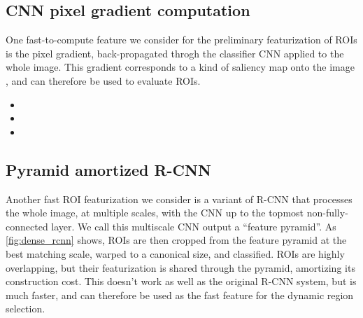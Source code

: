 \subsection{CNN pixel gradient computation}\label{sec:gradient}

One fast-to-compute feature we consider for the preliminary featurization of ROIs is the pixel gradient, back-propagated throgh the classifier CNN applied to the whole image.
This gradient corresponds to a kind of saliency map onto the image \cite{Simonyan-ICLR-2014}, and can therefore be used to evaluate ROIs.

\begin{itemize}
\itemsep1pt\parskip0pt
\item
\item
\item
\end{itemize}


\subsection{Pyramid amortized R-CNN}\label{sec:dense}

Another fast ROI featurization we consider is a variant of R-CNN that processes the whole image, at multiple scales, with the CNN up to the topmost non-fully-connected layer.
We call this multiscale CNN output a ``feature pyramid''.
As \autoref{fig:dense_rcnn} shows, ROIs are then cropped from the feature pyramid at the best matching scale, warped to a canonical size, and classified.
ROIs are highly overlapping, but their featurization is shared through the pyramid, amortizing its construction cost.
This doesn't work as well as the original R-CNN system, but is much faster, and can therefore be used as the fast feature for the dynamic region selection.

